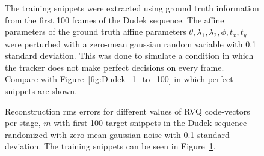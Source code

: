 								\begin{figure}[h]
								\centering
								\caption{The training snippets were extracted using ground truth information from the first 100 frames of the Dudek sequence.  The affine parameters of the ground truth affine parameters $\theta, \lambda_1, \lambda_2, \phi, t_x, t_y$ were perturbed with a zero-mean gaussian random variable with 0.1 standard deviation.  This was done to simulate a condition in which the tracker does not make perfect decisions on every frame.  Compare with Figure~\ref{fig:Dudek_1_to_100} in which perfect snippets are shown.}
								\label{fig:aRVQ_dudek_first_100rand_snippets}
								\end{figure}

								\begin{figure}
								\centering
								\subtable{\begin{tiny}\end{tiny}}
								\caption{Reconstruction rms errors for different values of RVQ code-vectors per stage, $m$ with first 100 target snippets in the Dudek sequence randomized with zero-mean gaussian noise with 0.1 standard deviation.  The training snippets can be seen in Figure~\ref{fig:aRVQ_dudek_first_100rand_snippets}.}
								\label{fig:aRVQ_Dudek_first_100_rand}
								\end{figure}



